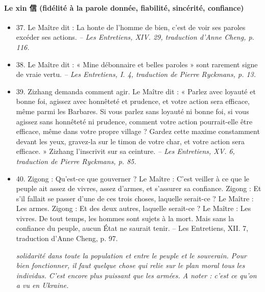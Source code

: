 \paragraph{Le xin 信 (fidélité à la parole donnée, fiabilité, sincérité, confiance)}  
\begin{itemize}
     
\item 37. \newline Le Maître dit : La honte de l’homme de bien, c’est de voir ses paroles excéder ses actions. \textit{\small  -- Les Entretiens, XIV. 29, traduction d’Anne Cheng, p. 116.  }
\item 38. \newline Le Maître dit : « Mine débonnaire et belles paroles » sont rarement signe de vraie vertu.  \textit{\small -- Les Entretiens, I. 4, traduction de Pierre Ryckmans, p. 13.  }
\item 39. \newline Zizhang demanda comment agir. \newline Le Maître dit : « Parlez avec loyauté et bonne foi, agissez avec honnêteté et prudence, et votre action sera efficace, même parmi les Barbares. Si vous parlez sans loyauté ni bonne foi, si vous agissez sans honnêteté ni prudence, comment votre action pourrait-elle être efficace, même dans votre propre village ? Gardez cette maxime constamment devant les yeux, gravez-la sur le timon de votre char, et votre action sera efficace. » \newline Zizhang l’inscrivit sur sa ceinture.  \textit{\small -- Les Entretiens, XV. 6, traduction de Pierre Ryckmans, p. 85.  }


\item 40. \newline Zigong : Qu’est-ce que gouverner ? \newline Le Maître : C’est veiller à ce que le peuple ait assez de vivres, assez d’armes, et s’assurer sa confiance. \newline Zigong : Et s’il fallait se passer d’une de ces trois choses, laquelle serait-ce ? \newline Le Maître : Les armes. \newline Zigong : Et des deux autres, laquelle serait-ce ? \newline Le Maître : Les vivres. De tout temps, les hommes sont sujets à la mort. Mais sans la confiance du peuple, aucun État ne saurait tenir. -- Les Entretiens, XII. 7, traduction d’Anne Cheng, p. 97.  

\textit{solidarité dans toute la population et entre le peuple et le souverain. Pour bien fonctionner, il faut quelque chose qui relie sur le plan moral tous les individus. C'est encore plus puissant que les armées. A noter : c'est ce qu'on a vu en Ukraine. }


\end{itemize}
